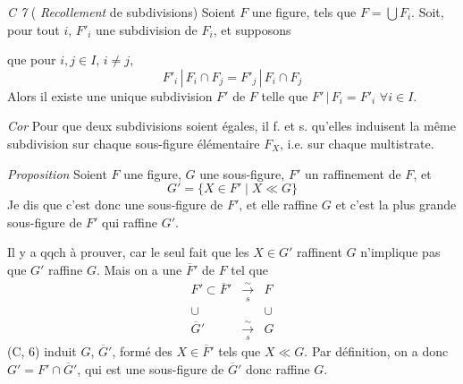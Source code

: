 \documentclass[11pt,a4paper]{article}
\begin{document}
\emph{C 7} \quad (\struck{\ill{}} \emph{Recollement} de subdivisions) Soient $F$ une figure, \struck{\ill{}}  tels que $F = \bigcup F_i$. Soit, pour tout $i$, $F'_i$ une subdivision de $F_i$, et supposons

que pour \struck{\ill{}} $i, j \in I$, $i \neq j$,
\[
  F'_i \,|\, F_i \cap F_j = F'_j \,|\, F_i \cap F_j
\]
Alors il existe une unique subdivision $F'$ de $F$ telle que $F' \,|\, F_i = F'_i$ \quad $\forall i \in I$.

\emph{Cor} \quad Pour que deux subdivisions  soient égales, il f. et s. qu'elles induisent la même subdivision sur chaque sous-figure élémentaire $F_X$, i.e. sur chaque multistrate.

\emph{ Proposition} \quad Soient $F$ une figure, $G$ une sous-figure, $F'$ un raffinement de $F$, et
\[
  G' = \lbrace X \in F' \mid X \ll G \rbrace
\]
Je dis que c'est donc une sous-figure \add{\ill{}} de $F'$, et elle raffine $G$ et c'est la plus grande sous-figure de $F'$ qui raffine $G'$.

 Il y a qqch à prouver, car le seul fait que les $X \in G'$ raffinent $G$ n'implique pas que $G'$ raffine $G$. Mais on a une   $\overline{F}'$ de $F$ tel que
\[
  \begin{array}{ccc}
    F' \subset \overline{F}' & \xrightarrow[s]{\sim} & F \\
    \cup & & \cup \\
    \overline{G}' & \xrightarrow[s]{\sim} & G
  \end{array}
\]
(C, 6) induit \struck{\ill{}} $G$, $\overline{G}'$, formé des $X \in \overline{F}'$ tels que $X \ll G$. \struck{\ill{}} Par définition, on a donc
$G' = F' \cap \overline{G}'$, qui est \struck{\ill{}} une sous-figure de $\overline{G}'$ donc raffine $G$.
\end{document}
